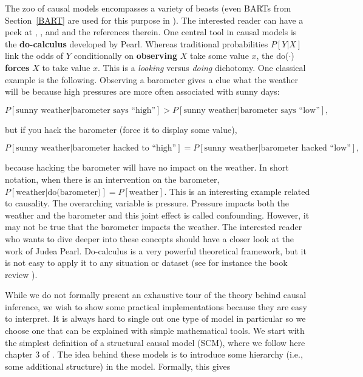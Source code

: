 The zoo of causal models encompasses a variety of beasts (even BARTs from Section~\ref{BART} are used for this purpose in \cite{hahn2019bayesian}). The interested reader can have a peek at \cite{pearl2009causality}, \cite{peters2017elements}, \cite{maathuis2018handbook} and \cite{hunermund2019causal} and the references therein. One central tool in causal models is the \textbf{do-calculus} developed by Pearl. Whereas traditional probabilities $P[Y|X]$ link the odds of $Y$ conditionally on \textbf{observing} $X$ take some value $x$, the do($\cdot$) \textbf{forces} $X$ to take value $x$. This is a \textit{looking} versus \textit{doing} dichotomy. One classical example is the following. Observing a barometer gives a clue what the weather will be because high pressures are more often associated with sunny days:

\begin{equation}
P[\text{sunny weather}|\text{barometer says ``high''} ]>P[\text{sunny weather}|\text{barometer says ``low''} ],
\end{equation}

but if you hack the barometer (force it to display some value),

\begin{equation}
P[\text{sunny weather}|\text{barometer hacked to ``high''} ]=P[\text{sunny weather}|\text{barometer hacked ``low''} ],
\end{equation}

because hacking the barometer will have no impact on the weather. In short notation, when there is an intervention on the barometer, $P[\text{weather}|\text{do(barometer)}]=P[\text{weather}]$. This is an interesting example related to causality. The overarching variable is pressure. Pressure impacts both the weather and the barometer and this joint effect is called confounding. However, it may not be true that the barometer impacts the weather. The interested reader who wants to dive deeper into these concepts should have a closer look at the work of Judea Pearl. Do-calculus is a very powerful theoretical framework, but it is not easy to apply it to any situation or dataset (see for instance the book review \cite{aronow2020book}).

While we do not formally present an exhaustive tour of the theory behind causal inference, we wish to show some practical implementations because they are easy to interpret. It is always hard to single out one type of model in particular so we choose one that can be explained with simple mathematical tools. We start with the simplest definition of a structural causal model (SCM), where we follow here chapter 3 of \cite{peters2017elements}. The idea behind these models is to introduce some hierarchy (i.e., some additional structure) in the model. Formally, this gives

